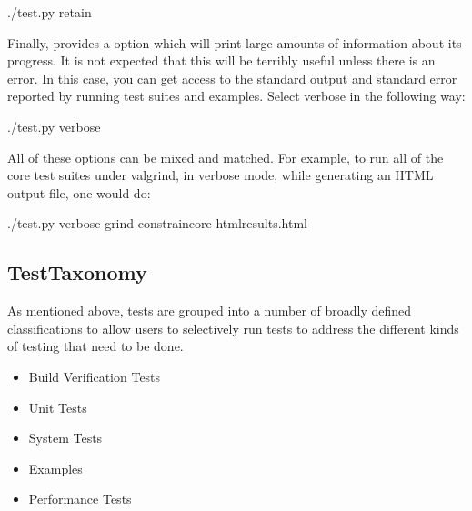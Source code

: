 \documentclass[letterpaper,10pt,english]{sphinxmanual}
\renewcommand{\sphinxcode}[1]{\texttt{\small{#1}}}
\begin{document}
\begin{sphinxVerbatim}[commandchars=\\\{\}]
\PYGZdl{} ./test.py \PYGZhy{}\PYGZhy{}retain
\end{sphinxVerbatim}

Finally, \sphinxcode{} provides a \sphinxcode{\sphinxupquote{\sphinxhyphen{}\sphinxhyphen{}verbose}} option which will print
large amounts of information about its progress.  It is not expected that this
will be terribly useful unless there is an error.  In this case, you can get
access to the standard output and standard error reported by running test suites
and examples.  Select verbose in the following way:

\begin{sphinxVerbatim}[commandchars=\\\{\}]
\PYGZdl{} ./test.py \PYGZhy{}\PYGZhy{}verbose
\end{sphinxVerbatim}

All of these options can be mixed and matched.  For example, to run all of the
 core test suites under valgrind, in verbose mode, while generating an HTML
output file, one would do:

\begin{sphinxVerbatim}[commandchars=\\\{\}]
\PYGZdl{} ./test.py \PYGZhy{}\PYGZhy{}verbose \PYGZhy{}\PYGZhy{}grind \PYGZhy{}\PYGZhy{}constraincore \PYGZhy{}\PYGZhy{}htmlresults.html
\end{sphinxVerbatim}


\subsection{TestTaxonomy}
\label{\detokenize{test-framework:testtaxonomy}}
As mentioned above, tests are grouped into a number of broadly defined
classifications to allow users to selectively run tests to address the different
kinds of testing that need to be done.
\begin{itemize}
\item {} 
Build Verification Tests

\item {} 
Unit Tests

\item {} 
System Tests

\item {} 
Examples

\item {} 
Performance Tests

\end{itemize}
\end{document}
